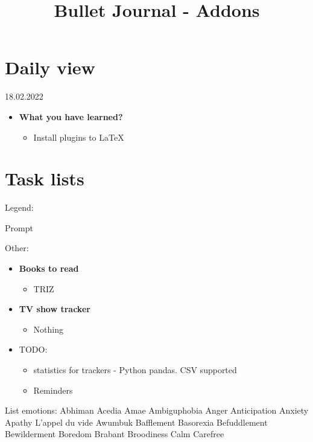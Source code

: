 \documentclass[a4paper]{article}
\title{Bullet Journal - Addons}
\begin{document}
\maketitle
\tableofcontents
\newpage
\section{Daily view}
18.02.2022
\begin{itemize}
	\item \textbf{What you have learned?}
    \begin{itemize}
        \item Install plugins to LaTeX
    \end{itemize}
\end{itemize}
\newpage
\section{Task lists}
Legend:
\begin{itemize}
	 [+] Prompt 
\end{itemize}
Other:
\begin{itemize}
	\item \textbf{Books to read}
    \begin{itemize}
        \item TRIZ
    \end{itemize}
\end{itemize}
\begin{itemize}
	\item \textbf{TV show tracker}
    \begin{itemize}
        \item Nothing
    \end{itemize}
\end{itemize}
\begin{itemize}
	\item TODO:
    \begin{itemize}
		 		\item statistics for trackers - Python pandas. CSV supported
		 		\item Reminders
    \end{itemize}
     \end{itemize}
\newpage
List emotions:
	 Abhiman
	 Acedia
	 Amae
	 Ambiguphobia
	 Anger
	 Anticipation
	 Anxiety
	 Apathy
	 L’appel du vide
	 Awumbuk
	 Bafflement
	 Basorexia
	 Befuddlement
	 Bewilderment
	 Boredom
	 Brabant
	 Broodiness
	 Calm
	 Carefree
\end{document}
